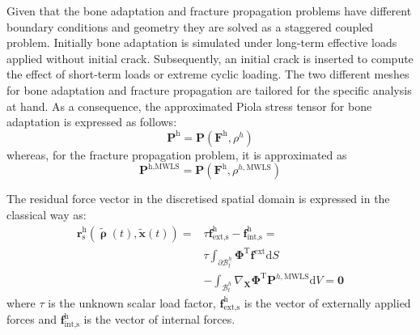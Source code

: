 \documentclass[twocolumn]{svjour3}
\begin{document}
Given that the bone adaptation and fracture propagation problems have different boundary conditions and geometry they are solved as 
a staggered coupled problem. Initially bone adaptation is simulated under 
long-term effective loads applied without initial crack. Subsequently, an 
initial crack is inserted to compute the effect 
of short-term loads or extreme cyclic loading. The two different meshes for bone adaptation and fracture propagation 
are tailored for the specific analysis at hand. As
a consequence, the approximated Piola stress tensor for bone
adaptation is expressed as follows:
\begin{equation}
	\mathbf{P}^\textrm{h} = 
		\mathbf{P}(\mathbf{F}^\textrm{h}, \rho^h)
\end{equation}
whereas, for the fracture propagation problem, it is approximated as
\begin{equation}
	\mathbf{P}^{\textrm{h},\textrm{MWLS}} = 
		\mathbf{P}(
		\mathbf{F}^\textrm{h}, \rho^{h,\textrm{MWLS}})
\end{equation}

The residual force vector in the discretised spatial domain is expressed in the classical way as:
\begin{equation}
\begin{aligned}
\label{spatial_residual}
	\mathbf{r}_\textrm{s}^\textrm{h}(\tilde{\pmb\uprho}(t), \tilde{\mathbf{x}}(t)) =& \tau\mathbf{f}^\textrm{h}_\textrm{ext,s}-\mathbf{f}^\textrm{h}_\textrm{int,s}= \\
	&\tau \int_{\partial\mathcal{B}^h_t} \pmb{\Phi}^\textrm{T}
	\mathbf{f}^\textrm{ext}
	\textrm{d}S\\
	&- \int_{\mathcal{B}^h_t} \nabla_\mathbf{X} \pmb{\Phi}^\textrm{T}
	\mathbf{P}^{h,\textrm{MWLS}}\textrm{d}V=\mathbf{0}
	\end{aligned}
\end{equation}
where $\tau$ is the unknown scalar load factor, $\mathbf{f}^\textrm{h}_\textrm{ext,s}$ is the vector of externally applied forces and $\mathbf{f}^\textrm{h}_\textrm{int,s}$ is the vector of internal forces. 
\end{document}
